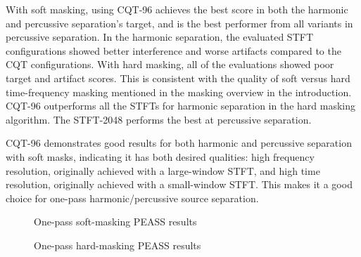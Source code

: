 \documentclass[letter,12pt]{article}
\begin{document}
With soft masking, using CQT-96 achieves the best score in both the harmonic and percussive separation's target, and is the best performer from all variants in percussive separation. In the harmonic separation, the evaluated STFT configurations showed better interference and worse artifacts compared to the CQT configurations. With hard masking, all of the evaluations showed poor target and artifact scores. This is consistent with the quality of soft versus hard time-frequency masking mentioned in the masking overview \cite{masking} in the introduction. CQT-96 outperforms all the STFTs for harmonic separation in the hard masking algorithm. The STFT-2048 performs the best at percussive separation.

CQT-96 demonstrates good results for both harmonic and percussive separation with soft masks, indicating it has both desired qualities: high frequency resolution, originally achieved with a large-window STFT, and high time resolution, originally achieved with a small-window STFT. This makes it a good choice for one-pass harmonic/percussive source separation.

\begin{figure}[ht]
	\centering
	\caption{One-pass soft-masking PEASS results}
	\label{fig:round1soft}
\end{figure}

\begin{figure}[ht]
	\centering
	\vspace{-1.25em}
	\caption{One-pass hard-masking PEASS results}
	\label{fig:round1hard}
\end{figure}
\end{document}
